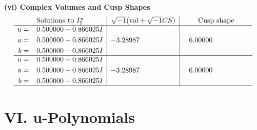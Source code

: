 \documentclass[1p]{elsarticle_modified}
\theoremstyle{definition}
\newcommand{\I}{\sqrt{-1}}
\begin{document}
\newpage\flushleft \textbf{(vi) Complex Volumes and Cusp Shapes}
$$\begin{array}{c|c|c}  
\text{Solutions to }I^u_{5}& \I (\text{vol} + \sqrt{-1}CS) & \text{Cusp shape}\\
 \hline 
\begin{aligned}
u &= \phantom{-}0.500000 + 0.866025 I \\
a &= \phantom{-}0.500000 - 0.866025 I \\
b &= \phantom{-}0.500000 - 0.866025 I\end{aligned}
 & -3.28987\phantom{ +0.000000I} & \phantom{-}6.00000\phantom{ +0.000000I} \\ \hline\begin{aligned}
u &= \phantom{-}0.500000 - 0.866025 I \\
a &= \phantom{-}0.500000 + 0.866025 I \\
b &= \phantom{-}0.500000 + 0.866025 I\end{aligned}
 & -3.28987\phantom{ +0.000000I} & \phantom{-}6.00000\phantom{ +0.000000I}\\
 \hline 
 \end{array}$$\newpage
\newpage\renewcommand{\arraystretch}{1}
\centering \section*{ VI. u-Polynomials}
\end{document}
